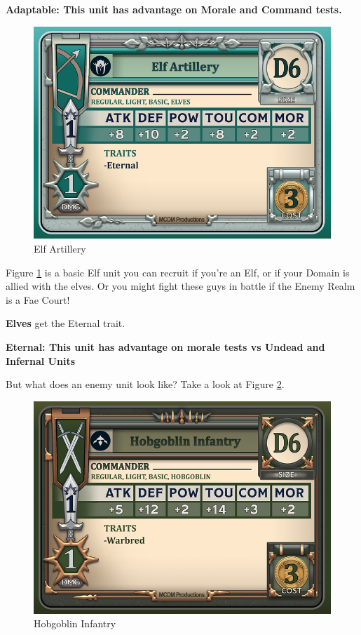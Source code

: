 \documentclass[letterpaper,twocolumn,openany,nodeprecatedcode]{dndbook}
\begin{document}
\textbf{Adaptable: This unit has advantage on Morale and Command tests.}

\begin{figure}
  \includegraphics[width=\linewidth]{images/Elf Artillery.png}
  \caption{Elf Artillery}
  \label{fig:elf_art}
\end{figure}


Figure \ref{fig:elf_art} is a basic Elf unit you can recruit if you're an Elf, or if your Domain is allied with the elves. Or you might fight these guys in battle if the Enemy Realm is a Fae Court!

\textbf{Elves} get the Eternal trait.

\textbf{Eternal: This unit has advantage on morale tests vs Undead and Infernal Units}


But what does an enemy unit look like? Take a look at Figure \ref{fig:hobgoblin_inf}.

\begin{figure}
  \includegraphics[width=\linewidth]{images/Hobgoblin Infantry.png}
  \caption{Hobgoblin Infantry}
  \label{fig:hobgoblin_inf}
\end{figure}
\end{document}
